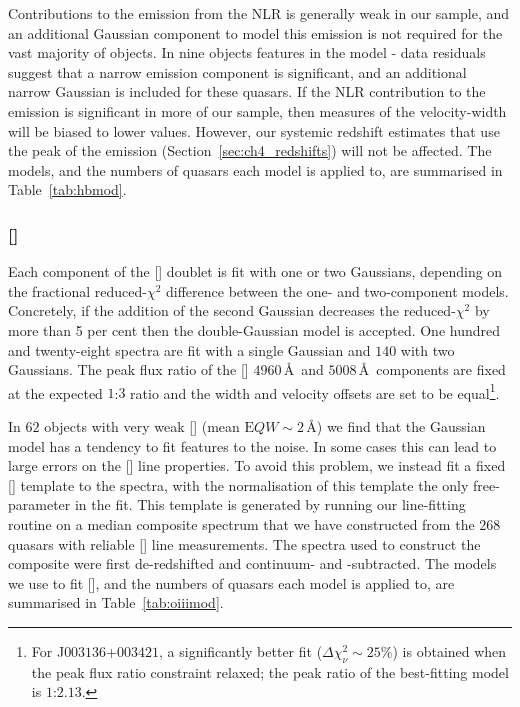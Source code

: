 Contributions to the \hb emission from the NLR is generally weak in our sample, and an additional Gaussian component to model this emission is not required for the vast majority of objects. 
In nine objects features in the model - data residuals suggest that a narrow emission component is significant, and an additional narrow Gaussian is included for these quasars. 
If the NLR contribution to the \hb emission is significant in more of our sample, then measures of the \hb velocity-width will be biased to lower values. 
However, our systemic redshift estimates that use the peak of the \hb emission (Section~\ref{sec:ch4_redshifts}) will not be affected. 
The \hb models, and the numbers of quasars each model is applied to, are summarised in Table~\ref{tab:hbmod}. 

\subsubsection{[]}

Each component of the [] doublet is fit with one or two Gaussians, depending on the fractional reduced-$\chi^2$ difference between the one- and two-component models. 
Concretely, if the addition of the second Gaussian decreases the reduced-$\chi^2$ by more than 5 per cent then the double-Gaussian model is accepted.
One hundred and twenty-eight spectra are fit with a single Gaussian and $140$ with two Gaussians. 
The peak flux ratio of the [] $4960$\,\AA\, and $5008$\,\AA\, components are fixed at the expected $1$:$3$ ratio and the width and velocity offsets are set to be equal\footnote{For J$003136$+$003421$, a significantly better fit ($\Delta \chi^2_{\nu} \sim 25\%$) is obtained when the peak flux ratio constraint relaxed; the peak ratio of the best-fitting model is $1$:$2.13$.}.

In $62$ objects with very weak [] (mean ${\mathrm EQW}\sim2$\,\AA) we find that the Gaussian model has a tendency to fit features to the noise. 
In some cases this can lead to large errors on the [] line properties. 
To avoid this problem, we instead fit a fixed [] template to the spectra, with the normalisation of this template the only free-parameter in the fit.
This template is generated by running our line-fitting routine on a median composite spectrum that we have constructed from the $268$ quasars with reliable [] line measurements.  
The spectra used to construct the composite were first de-redshifted and continuum- and -subtracted.  
The models we use to fit [], and the numbers of quasars each model is applied to, are summarised in Table~\ref{tab:oiiimod}.

